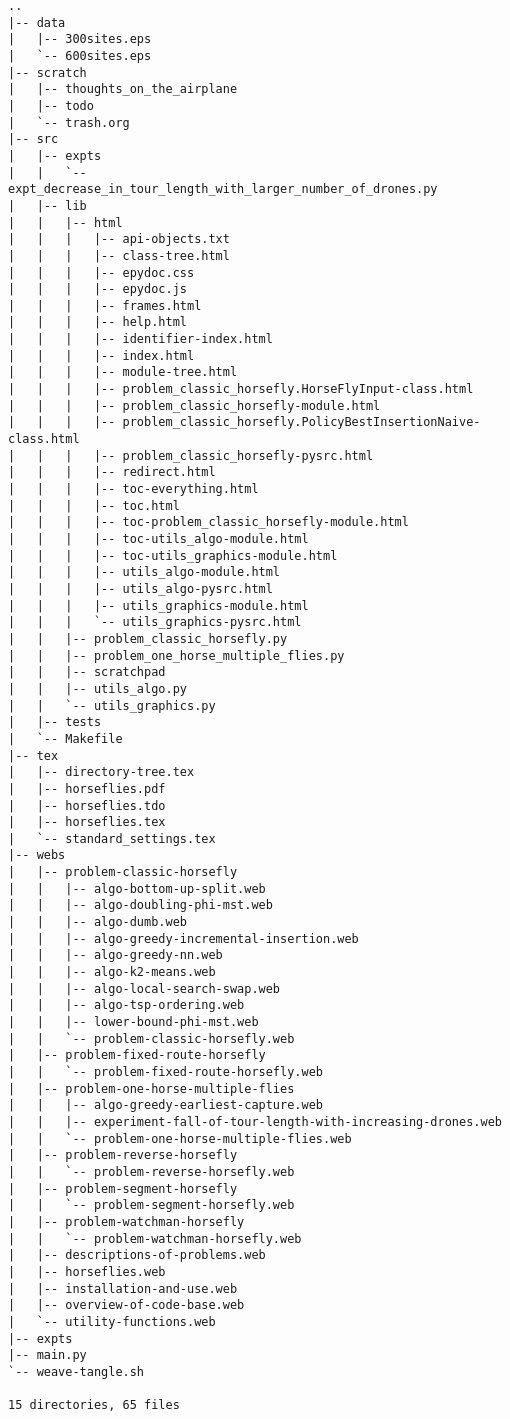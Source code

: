 \begin{verbatim}
..
|-- data
|   |-- 300sites.eps
|   `-- 600sites.eps
|-- scratch
|   |-- thoughts_on_the_airplane
|   |-- todo
|   `-- trash.org
|-- src
|   |-- expts
|   |   `-- expt_decrease_in_tour_length_with_larger_number_of_drones.py
|   |-- lib
|   |   |-- html
|   |   |   |-- api-objects.txt
|   |   |   |-- class-tree.html
|   |   |   |-- epydoc.css
|   |   |   |-- epydoc.js
|   |   |   |-- frames.html
|   |   |   |-- help.html
|   |   |   |-- identifier-index.html
|   |   |   |-- index.html
|   |   |   |-- module-tree.html
|   |   |   |-- problem_classic_horsefly.HorseFlyInput-class.html
|   |   |   |-- problem_classic_horsefly-module.html
|   |   |   |-- problem_classic_horsefly.PolicyBestInsertionNaive-class.html
|   |   |   |-- problem_classic_horsefly-pysrc.html
|   |   |   |-- redirect.html
|   |   |   |-- toc-everything.html
|   |   |   |-- toc.html
|   |   |   |-- toc-problem_classic_horsefly-module.html
|   |   |   |-- toc-utils_algo-module.html
|   |   |   |-- toc-utils_graphics-module.html
|   |   |   |-- utils_algo-module.html
|   |   |   |-- utils_algo-pysrc.html
|   |   |   |-- utils_graphics-module.html
|   |   |   `-- utils_graphics-pysrc.html
|   |   |-- problem_classic_horsefly.py
|   |   |-- problem_one_horse_multiple_flies.py
|   |   |-- scratchpad
|   |   |-- utils_algo.py
|   |   `-- utils_graphics.py
|   |-- tests
|   `-- Makefile
|-- tex
|   |-- directory-tree.tex
|   |-- horseflies.pdf
|   |-- horseflies.tdo
|   |-- horseflies.tex
|   `-- standard_settings.tex
|-- webs
|   |-- problem-classic-horsefly
|   |   |-- algo-bottom-up-split.web
|   |   |-- algo-doubling-phi-mst.web
|   |   |-- algo-dumb.web
|   |   |-- algo-greedy-incremental-insertion.web
|   |   |-- algo-greedy-nn.web
|   |   |-- algo-k2-means.web
|   |   |-- algo-local-search-swap.web
|   |   |-- algo-tsp-ordering.web
|   |   |-- lower-bound-phi-mst.web
|   |   `-- problem-classic-horsefly.web
|   |-- problem-fixed-route-horsefly
|   |   `-- problem-fixed-route-horsefly.web
|   |-- problem-one-horse-multiple-flies
|   |   |-- algo-greedy-earliest-capture.web
|   |   |-- experiment-fall-of-tour-length-with-increasing-drones.web
|   |   `-- problem-one-horse-multiple-flies.web
|   |-- problem-reverse-horsefly
|   |   `-- problem-reverse-horsefly.web
|   |-- problem-segment-horsefly
|   |   `-- problem-segment-horsefly.web
|   |-- problem-watchman-horsefly
|   |   `-- problem-watchman-horsefly.web
|   |-- descriptions-of-problems.web
|   |-- horseflies.web
|   |-- installation-and-use.web
|   |-- overview-of-code-base.web
|   `-- utility-functions.web
|-- expts
|-- main.py
`-- weave-tangle.sh

15 directories, 65 files
\end{verbatim}
